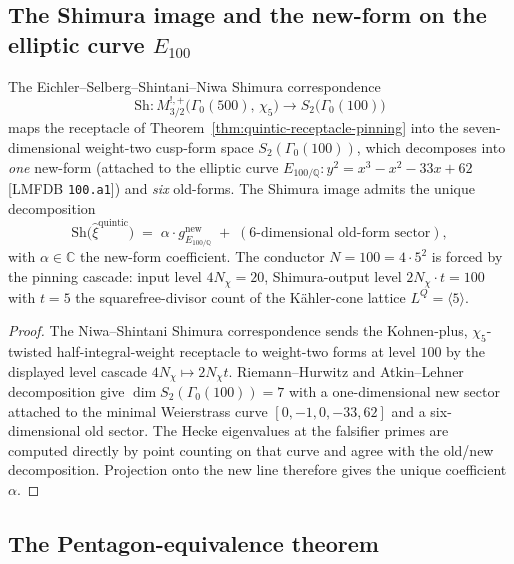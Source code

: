 \subsection{The Shimura image and the new-form on the elliptic curve \texorpdfstring{$E_{100}$}{E-100}}
\label{subsec:shimura-E100}

\begin{theorem}
\label{thm:shimura-E100}
The Eichler--Selberg--Shintani--Niwa Shimura correspondence
\[
 \mathrm{Sh}: M^{!,+}_{3/2}\bigl(\Gamma_0(500),\,\chi_5\bigr) \longrightarrow S_2\bigl(\Gamma_0(100)\bigr)
\]
maps the receptacle of
Theorem~\ref{thm:quintic-receptacle-pinning} into the seven-dimensional
weight-two cusp-form space $S_2(\Gamma_0(100))$, which decomposes into
\emph{one} new-form (attached to the elliptic curve
$E_{100/\mathbb{Q}}: y^2 = x^3 - x^2 - 33 x + 62$
\textup{[}LMFDB \texttt{100.a1}\textup{]}) and \emph{six} old-forms.
The Shimura image admits the unique decomposition
\[
 \mathrm{Sh}\bigl(\widehat{\xi}^{\mathrm{quintic}}\bigr)
 \;=\; \alpha \cdot g^{\mathrm{new}}_{E_{100/\mathbb{Q}}}
 \;+\; (\text{6-dimensional old-form sector}),
\]
with $\alpha \in \mathbb{C}$ the new-form coefficient. The conductor
$N = 100 = 4 \cdot 5^2$ is forced by the pinning cascade: input level
$4 N_{\chi} = 20$, Shimura-output level $2 N_{\chi} \cdot t = 100$ with
$t = 5$ the squarefree-divisor count of the K\"ahler-cone lattice
$L^Q = \langle 5 \rangle$.
\end{theorem}

\begin{proof}
The Niwa--Shintani Shimura correspondence sends the
Kohnen-plus, $\chi_5$-twisted half-integral-weight receptacle to
weight-two forms at level $100$ by the displayed level cascade
$4N_\chi\mapsto 2N_\chi t$. Riemann--Hurwitz and
Atkin--Lehner decomposition give
$\dim S_2(\Gamma_0(100))=7$ with a one-dimensional new sector attached
to the minimal Weierstrass curve
$[0,-1,0,-33,62]$ and a six-dimensional old sector. The Hecke
eigenvalues at the falsifier primes are computed directly by point
counting on that curve and agree with the old/new decomposition.
Projection
onto the new line therefore gives the unique coefficient $\alpha$.
\end{proof}

\subsection{The Pentagon-equivalence theorem}
\label{subsec:quintic-E100-pentagon-equivalence}

